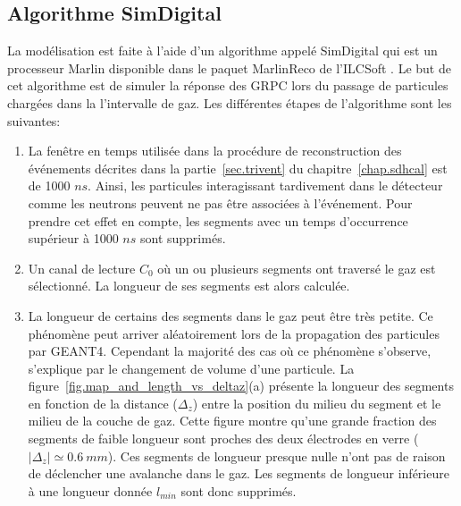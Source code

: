 \subsection{Algorithme SimDigital}
\label{sec.algo}
La modélisation est faite à l'aide d'un algorithme appelé SimDigital qui est un processeur Marlin \cite{marlin} disponible dans le paquet MarlinReco \cite{marlinreco} de l'ILCSoft \cite{ilcsoft}. Le but de cet algorithme est de simuler la réponse des GRPC lors du passage de particules chargées dans la l'intervalle de gaz. Les différentes étapes de l’algorithme sont les suivantes:
\begin{enumerate}[~~1-]
\item La fenêtre en temps utilisée dans la procédure de reconstruction des événements décrites dans la partie~\ref{sec.trivent} du chapitre~\ref{chap.sdhcal} est de 1000 $ns$. Ainsi, les particules interagissant tardivement dans le détecteur comme les neutrons peuvent ne pas être associées à l’événement. Pour prendre cet effet en compte, les segments avec un temps d’occurrence supérieur à 1000 $ns$ sont supprimés.
\item \label{it.start} Un canal de lecture $C_0$ où un ou plusieurs segments ont traversé le gaz est sélectionné. La longueur de ses segments est alors calculée.
\item La longueur de certains des segments dans le gaz peut être très petite. Ce phénomène peut arriver aléatoirement lors de la propagation des particules par GEANT4. Cependant la majorité des cas où ce phénomène s'observe, s'explique par le changement de volume d'une particule. La figure~\ref{fig.map_and_length_vs_deltaz}(a) présente la longueur des segments en fonction de la distance ($\Delta_z$) entre la position du milieu du segment et le milieu de la couche de gaz. Cette figure montre qu'une grande fraction des segments de faible longueur sont proches des deux électrodes en verre ($|\Delta_z|\simeq0.6~mm$). Ces segments de longueur presque nulle n'ont pas de raison de déclencher une avalanche dans le gaz. Les segments de longueur inférieure à une longueur donnée $l_{min}$ sont donc supprimés.
  \begin{figure}[!ht]

\end{figure}
\end{enumerate}

